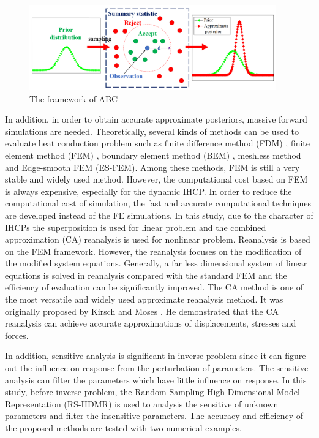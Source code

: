 \documentclass[review]{elsarticle}
\begin{document}
\begin{figure}
    \centering
    \includegraphics[width=0.95\textwidth]{fig/ABC.png}
    \caption{The framework of ABC}
    \label{fig:ABC}
\end{figure}
 
In addition, in order to obtain accurate approximate posteriors, massive forward simulations are needed. Theoretically, several kinds of methods can be used to evaluate heat conduction problem such as finite difference method (FDM)  \cite{alifanov2012inverse, yang1998solving, yang1999determination}, finite element method (FEM) \cite{alifanov2012inverse,krizek1998finite, palma2012non}, boundary element method (BEM) \cite{sutradhar2004simple, tanaka2006dual, martin1996inverse}, meshless method \cite{yan2009meshless} and Edge-smooth FEM (ES-FEM)\cite{cui2016steady, nguyen2011adaptive}. Among these methods, FEM is still a very stable and widely used method\cite{fatullayev2002numerical}. However, the computational cost based on FEM is always expensive, especially for the dynamic IHCP. In order to reduce the computational cost of simulation, the fast and accurate computational techniques are developed instead of the FE simulations. In this study, due to the character of IHCPs\cite{bozzoli2014estimation}  the superposition is used for linear problem and the combined approximation (CA) reanalysis is used for nonlinear problem. Reanalysis is based on the FEM framework. However, the reanalysis \cite{wang2016seen, wang2013parallel, wang2017reanalysis} focuses on the modification of the modified system equations. Generally, a far less dimensional system of linear equations is solved in reanalysis compared with the standard FEM and the efficiency of evaluation can be significantly improved. The CA method is one of the most versatile and widely used approximate reanalysis method. It was originally proposed by Kirsch and Moses \cite{krizek1998finite, kirsch2001exact}. He demonstrated that the CA reanalysis can achieve accurate approximations of displacements, stresses and forces. 

In addition, sensitive analysis is significant in inverse problem \cite{chantasiriwan2001algorithm} since it can figure out the influence on response from the perturbation of parameters. The sensitive analysis can filter the parameters which have little influence on response. In this study, before inverse problem, the Random Sampling-High Dimensional Model Representation (RS-HDMR) \cite{li2002practical,wang2017global} is used to analysis the sensitive of unknown parameters and filter the insensitive parameters. The accuracy and efficiency of the proposed methods are tested with two numerical examples.
\end{document}
